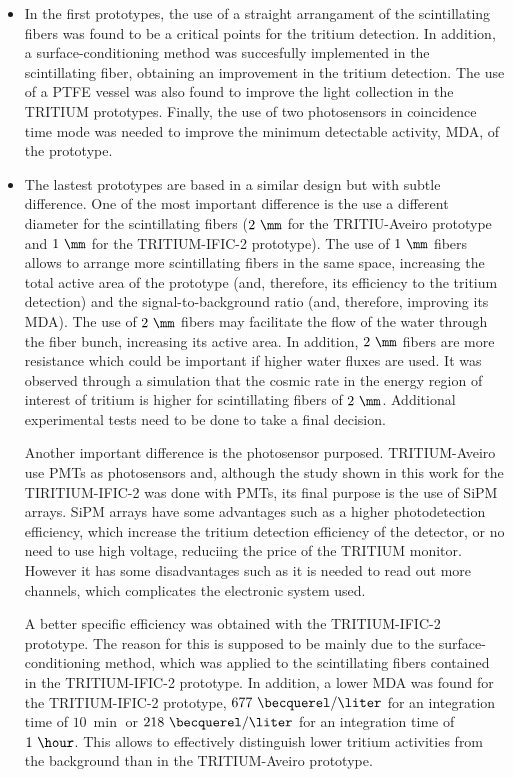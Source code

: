 \begin{itemize}

\item{} In the first prototypes, the use of a straight arrangament of the scintillating fibers was found to be a critical points for the tritium detection. In addition, a surface-conditioning method was succesfully implemented in the scintillating fiber, obtaining an improvement in the tritium detection. The use of a PTFE vessel was also found to improve the light collection in the TRITIUM prototypes. Finally, the use of two photosensors in coincidence time mode was needed to improve the minimum detectable activity, MDA, of the prototype.

\item{} The lastest prototypes are based in a similar design but with subtle difference. One of the most important difference is the use a different diameter for the scintillating fibers ($2~\mm$ for the TRITIU-Aveiro prototype and $1~\mm$ for the TRITIUM-IFIC-2 prototype). The use of $1~\mm$ fibers allows to arrange more scintillating fibers in the same space, increasing the total active area of the prototype (and, therefore, its efficiency to the tritium detection) and the signal-to-background ratio (and, therefore, improving its MDA). The use of $2~\mm$ fibers may facilitate the flow of the water through the fiber bunch, increasing its active area. In addition, $2~\mm$ fibers are more resistance which could be important if higher water fluxes are used. It was observed through a simulation that the cosmic rate in the energy region of interest of tritium is higher for scintillating fibers of $2~\mm$. Additional experimental tests need to be done to take a final decision.

Another important difference is the photosensor purposed. TRITIUM-Aveiro use PMTs as photosensors and, although the study shown in this work for the TIRITIUM-IFIC-2 was done with PMTs, its final purpose is the use of SiPM arrays. SiPM arrays have some advantages such as a higher photodetection efficiency, which increase the tritium detection efficiency of the detector, or no need to use high voltage, reduciing the price of the TRITIUM monitor. However it has some disadvantages such as it is needed to read out more channels, which complicates the electronic system used.

A better specific efficiency was obtained with the TRITIUM-IFIC-2 prototype. The reason for this is supposed to be mainly due to the surface-conditioning method, which was applied to the scintillating fibers contained in the TRITIUM-IFIC-2 prototype. In addition, a lower MDA was found for the TRITIUM-IFIC-2 prototype, $677~\becquerel/\liter$ for an integration time of $10~\min$ or $218~\becquerel/\liter$ for an integration time of $1~\hour$. This allows to effectively distinguish lower tritium activities from the background than in the TRITIUM-Aveiro prototype.


\end{itemize}
